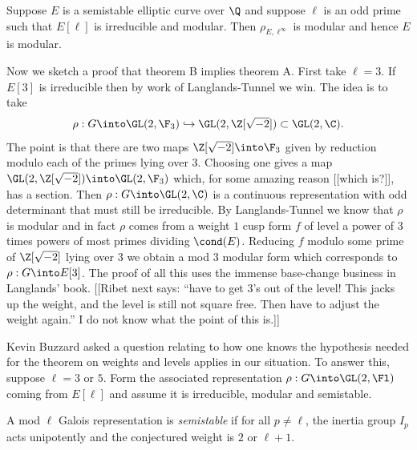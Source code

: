 \documentclass{report}
\begin{document}
\begin{theorem} Suppose $E$ is a semistable
elliptic curve over $\Q$ and suppose $\ell$ is an odd prime such that
$E[\ell]$  is irreducible and modular. Then $\rho_{E,\ell^{\infty}}$ is
modular and hence $E$ is modular. \end{theorem}

Now we sketch a proof that theorem B implies theorem A.
First take $\ell=3$. If $E[3]$ is irreducible then by work
of Langlands-Tunnel we win. The idea is to take
$$\rho:G\into\GL(2,\F_3)\hookrightarrow\GL(2,\Z[\sqrt{-2}])\subset\GL(2,\C).$$
The point is that there are two maps
$\Z[\sqrt{-2}]\into\F_3$ given by reduction modulo each
of the primes lying over $3$. Choosing one gives a map
$\GL(2,\Z[\sqrt{-2}])\into\GL(2,\F_3)$ which, for some
amazing reason [[which is?]], has a section.
Then $\rho:G\into\GL(2,\C)$ is a continuous representation with
odd determinant that must still be irreducible. By Langlands-Tunnel
we know that $\rho$ is modular and in fact $\rho$ comes from
a weight $1$ cusp form $f$ of level a power of 3 times powers of
most primes dividing $\cond(E)$. Reducing $f$ modulo some prime
of $\Z[\sqrt{-2}]$ lying over $3$ we obtain a mod $3$ modular
form which corresponds to $\rho:G\into E[3]$. The proof of all
this uses the immense base-change business in Langlands' book.
[[Ribet next says: ``have to get 3's out of the level! This jacks up the
weight, and the level is still not square free. Then have to adjust
the weight again.'' I do not know what the point of this is.]]

Kevin Buzzard asked a question relating to how one
knows the hypothesis needed for the theorem on weights and levels
applies in our situation. To answer this, suppose $\ell=3$ or $5$.
Form the associated representation $\rho:G\into\GL(2,\Fl)$ coming from
$E[\ell]$ and assume it is irreducible, modular and
semistable.

\begin{defn}
A mod $\ell$ Galois representation is {\em semistable} if
for all $p\neq\ell$, the inertia group $I_p$ acts unipotently
and the conjectured weight is $2$ or $\ell+1$.
\end{defn}
\end{document}
